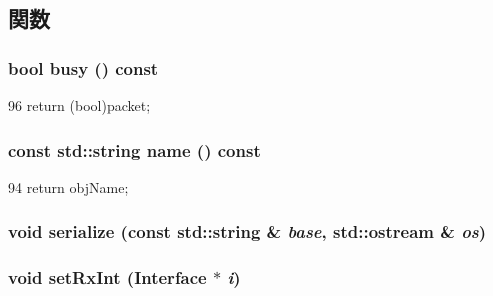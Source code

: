 \subsection{関数}
\hypertarget{classEtherLink_1_1Link_ab4dfde754c39017408feef7294770646}{
\subsubsection[{busy}]{\setlength{\rightskip}{0pt plus 5cm}bool busy () const}}
\label{classEtherLink_1_1Link_ab4dfde754c39017408feef7294770646}



\begin{DoxyCode}
96 { return (bool)packet; }
\end{DoxyCode}
\hypertarget{classEtherLink_1_1Link_a6490f765a824ced1cc94979609fe7e07}{
\subsubsection[{name}]{\setlength{\rightskip}{0pt plus 5cm}const std::string name () const}}
\label{classEtherLink_1_1Link_a6490f765a824ced1cc94979609fe7e07}



\begin{DoxyCode}
94 { return objName; }
\end{DoxyCode}
\hypertarget{classEtherLink_1_1Link_ab4138b21b48e3371a8e20df72b675a88}{
\subsubsection[{serialize}]{\setlength{\rightskip}{0pt plus 5cm}void serialize (const std::string \& {\em base}, \/  std::ostream \& {\em os})}}
\label{classEtherLink_1_1Link_ab4138b21b48e3371a8e20df72b675a88}
\hypertarget{classEtherLink_1_1Link_a26ca203034b85f4ca99fae85c5cf5819}{
\subsubsection[{setRxInt}]{\setlength{\rightskip}{0pt plus 5cm}void setRxInt ({\bf Interface} $\ast$ {\em i})}}
\label{classEtherLink_1_1Link_a26ca203034b85f4ca99fae85c5cf5819}



